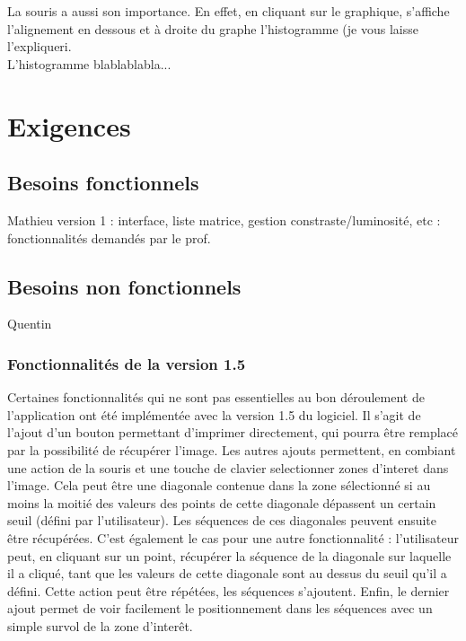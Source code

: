 \documentclass{report}
\begin{document}
La souris a aussi son importance. En effet, en cliquant sur le graphique, s'affiche l'alignement en dessous et à droite du graphe l'histogramme (je vous laisse l'expliquer^^).\\
L'histogramme blablablabla...


\chapter{Exigences}
\section{Besoins fonctionnels}
Mathieu
version 1 : interface, liste matrice, gestion constraste/luminosité, etc : fonctionnalités demandés par le prof.

\section{Besoins non fonctionnels}
Quentin


\subsection{Fonctionnalités de la version 1.5}
Certaines fonctionnalités qui ne sont pas essentielles au bon déroulement de l'application ont été implémentée avec la version 1.5 du logiciel. Il s'agit de l'ajout d'un bouton permettant d'imprimer directement, qui pourra être remplacé par la possibilité de récupérer l'image. Les autres ajouts permettent, en combiant une action de la souris et une touche de clavier selectionner zones d'interet dans l'image. Cela peut être une diagonale contenue dans la zone sélectionné si au moins la moitié des valeurs des points de cette diagonale dépassent un certain seuil (défini par l'utilisateur). Les séquences de ces diagonales peuvent ensuite être récupérées. C'est également le cas pour une autre fonctionnalité : l'utilisateur peut, en cliquant sur un point, récupérer la séquence de la diagonale sur laquelle il a cliqué, tant que les valeurs de cette diagonale sont au dessus du seuil qu'il a défini. Cette action peut être répétées, les séquences s'ajoutent. Enfin, le dernier ajout permet de voir facilement le positionnement dans les séquences avec un simple survol de la zone d'interêt.
\end{document}

